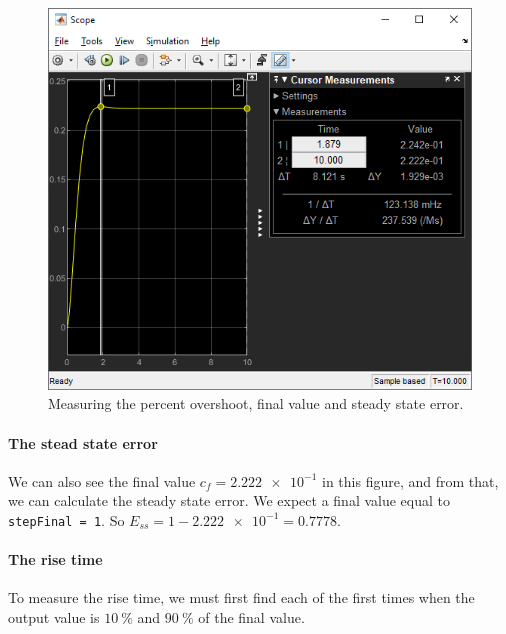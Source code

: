 \documentclass[12pt]{article}
\begin{document}
\begin{figure}[h]
    \centering
    \includegraphics[width=\linewidth]{part01a_measuring_pcOS.png}
    \caption{Measuring the percent overshoot, final value and steady state error.}
    \label{fig:step - measuring percent overshoot}
\end{figure}

\paragraph{The stead state error}
We can also see the final value $c_f = \num{2.222e-1}$ in this figure,
and from that, we can calculate the steady state error.
We expect a final value equal to \texttt{stepFinal = 1}.
So $E_{ss} = 1 - \num{2.222e-1} = 0.7778$.

\paragraph{The rise time} To measure the rise time,
we must first find each of the first times when the output value is $\SI{10}\percent$ and $\SI{90}\percent$
of the final value.
\end{document}
